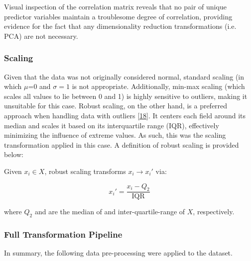 \documentclass[11pt, oneside]{article}   	%
\begin{document}
Visual inspection of the correlation matrix reveals that no pair of unique predictor variables maintain a troublesome degree of correlation, providing evidence for the fact that any dimensionality reduction transformations (i.e. PCA) are not necessary. 




\subsubsection{Scaling}

Given that the data was not originally considered normal, standard scaling (in which $\mu$=0 and $\sigma=1$ is not appropriate. Additionally, min-max scaling (which scales all values to lie between 0 and 1) is highly sensitive to outliers, making it unsuitable for this case. Robust scaling, on the other hand, is a preferred approach when handling data with outliers [\href{https://books.google.com/books/about/Exploratory_Data_Analysis.html?id=UT9dAAAAIAAJ}{18}]. It centers each field around its median and scales it based on its interquartile range (IQR), effectively minimizing the influence of extreme values. As such, this was the scaling transformation applied in this case. A definition of robust scaling is provided below:

Given \( x_i \in X \), robust scaling transforms \( x_i \to x_i' \) via:

\begin{equation}
x_i' = \frac{x_i - Q_2}{\text{IQR}}
\end{equation}

where $Q_2 $ and  are the median of  and inter-quartile-range of $ X$, respectively.




\subsubsection{Full Transformation Pipeline}

In summary, the following data pre-processing were applied to the dataset.
\end{document}
